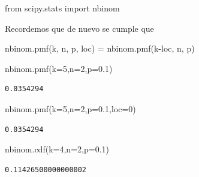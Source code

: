 \documentclass[
  letterpaper,
  DIV=11,
  numbers=noendperiod]{scrreprt}
\newenvironment{Shaded}{\begin{snugshade}}{\end{snugshade}}
\newcommand{\DecValTok}[1]{\textcolor[rgb]{0.68,0.00,0.00}{#1}}
\newcommand{\FloatTok}[1]{\textcolor[rgb]{0.68,0.00,0.00}{#1}}
\newcommand{\ImportTok}[1]{\textcolor[rgb]{0.00,0.46,0.62}{#1}}
\newcommand{\NormalTok}[1]{\textcolor[rgb]{0.00,0.23,0.31}{#1}}
\newcommand{\OperatorTok}[1]{\textcolor[rgb]{0.37,0.37,0.37}{#1}}
\begin{document}
\begin{Shaded}
\begin{Highlighting}[]
\ImportTok{from}\NormalTok{ scipy.stats }\ImportTok{import}\NormalTok{ nbinom}
\end{Highlighting}
\end{Shaded}

Recordemos que de nuevo se cumple que

\begin{Shaded}
\begin{Highlighting}[]
\NormalTok{nbinom.pmf(k, n, p, loc) }\OperatorTok{=}\NormalTok{ nbinom.pmf(k}\OperatorTok{{-}}\NormalTok{loc, n, p)\textasciigrave{}}
\end{Highlighting}
\end{Shaded}

\begin{Shaded}
\begin{Highlighting}[]
\NormalTok{nbinom.pmf(k}\OperatorTok{=}\DecValTok{5}\NormalTok{,n}\OperatorTok{=}\DecValTok{2}\NormalTok{,p}\OperatorTok{=}\FloatTok{0.1}\NormalTok{)}
\end{Highlighting}
\end{Shaded}

\begin{verbatim}
0.0354294
\end{verbatim}

\begin{Shaded}
\begin{Highlighting}[]
\NormalTok{nbinom.pmf(k}\OperatorTok{=}\DecValTok{5}\NormalTok{,n}\OperatorTok{=}\DecValTok{2}\NormalTok{,p}\OperatorTok{=}\FloatTok{0.1}\NormalTok{,loc}\OperatorTok{=}\DecValTok{0}\NormalTok{)}
\end{Highlighting}
\end{Shaded}

\begin{verbatim}
0.0354294
\end{verbatim}

\begin{Shaded}
\begin{Highlighting}[]
\NormalTok{nbinom.cdf(k}\OperatorTok{=}\DecValTok{4}\NormalTok{,n}\OperatorTok{=}\DecValTok{2}\NormalTok{,p}\OperatorTok{=}\FloatTok{0.1}\NormalTok{)}
\end{Highlighting}
\end{Shaded}

\begin{verbatim}
0.11426500000000002
\end{verbatim}
\end{document}
